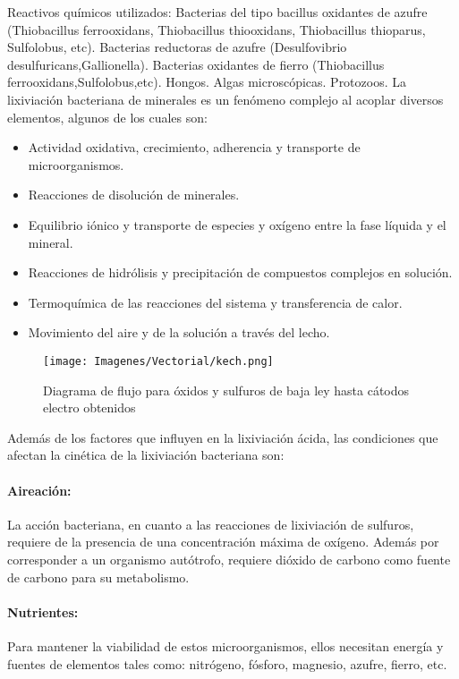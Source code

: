Reactivos qu\'imicos utilizados:
Bacterias del tipo bacillus oxidantes de azufre (Thiobacillus ferrooxidans, Thiobacillus thiooxidans, Thiobacillus thioparus, Sulfolobus, etc).
Bacterias reductoras de azufre (Desulfovibrio desulfuricans,Gallionella).
Bacterias oxidantes de fierro (Thiobacillus ferrooxidans,Sulfolobus,etc).
Hongos.
Algas microsc\'opicas.
Protozoos.
La lixiviaci\'on bacteriana de minerales es un fen\'omeno complejo al acoplar diversos elementos, algunos de los cuales son:
\begin{itemize}
 \item Actividad oxidativa, crecimiento, adherencia y transporte de microorganismos.
 \item Reacciones de disoluci\'on de minerales.
 \item Equilibrio i\'onico y transporte de especies y ox\'igeno entre la fase l\'iquida y el mineral.
 \item Reacciones de hidr\'olisis y precipitaci\'on de compuestos complejos en soluci\'on.
 \item Termoqu\'imica de las reacciones del sistema y transferencia de calor.
 \item Movimiento del aire y de la soluci\'on a trav\'es del lecho.
\end{itemize}

\begin{figure}[H]
 \centering
 \texttt{[image: Imagenes/Vectorial/kech.png]}
 \caption{Diagrama de flujo para \'oxidos y sulfuros de baja ley hasta c\'atodos electro obtenidos}
 \label{fig:ke}
\end{figure}

Adem\'as de los factores que influyen en la lixiviaci\'on \'acida, las condiciones que afectan la cin\'etica de la lixiviaci\'on bacteriana son:\\

\paragraph{Aireaci\'on:} La acci\'on bacteriana, en cuanto a las reacciones de lixiviaci\'on de sulfuros, requiere de la presencia de una concentraci\'on m\'axima de ox\'igeno. Adem\'as por corresponder a un organismo aut\'otrofo, requiere di\'oxido de carbono como fuente de carbono para su metabolismo.\\

\paragraph{Nutrientes:} Para mantener la viabilidad de estos microorganismos, ellos necesitan energ\'ia y fuentes de elementos tales como: nitr\'ogeno, f\'osforo, magnesio, azufre, fierro, etc. \\

